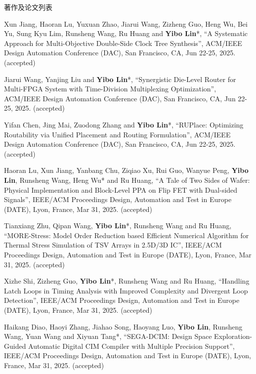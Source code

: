 \begin{rSection}{著作及论文列表}
\begin{description}[font=\normalfont, rightmargin=2em]
\item[{[C176]}]{
        Xun Jiang, Haoran Lu, Yuxuan Zhao, Jiarui Wang, Zizheng Guo, Heng Wu, Bei Yu, Sung Kyu Lim, Runsheng Wang, Ru Huang and \textbf{Yibo Lin}*, 
    ``A Systematic Approach for Multi-Objective Double-Side Clock Tree Synthesis'', 
    ACM/IEEE Design Automation Conference (DAC), San Francisco, CA, Jun 22-25, 2025.
    (accepted)
}
            

\item[{[C175]}]{
        Jiarui Wang, Yanjing Liu and \textbf{Yibo Lin}*, 
    ``Synergistic Die-Level Router for Multi-FPGA System with Time-Division Multiplexing Optimization'', 
    ACM/IEEE Design Automation Conference (DAC), San Francisco, CA, Jun 22-25, 2025.
    (accepted)
}
            

\item[{[C174]}]{
        Yifan Chen, Jing Mai, Zuodong Zhang and \textbf{Yibo Lin}*, 
    ``RUPlace: Optimizing Routability via Unified Placement and Routing Formulation'', 
    ACM/IEEE Design Automation Conference (DAC), San Francisco, CA, Jun 22-25, 2025.
    (accepted)
}
            

\item[{[C173]}]{
        Haoran Lu, Xun Jiang, Yanbang Chu, Ziqiao Xu, Rui Guo, Wanyue Peng, \textbf{Yibo Lin}, Runsheng Wang, Heng Wu* and Ru Huang, 
    ``A Tale of Two Sides of Wafer: Physical Implementation and Block-Level PPA on Flip FET with Dual-sided Signals'', 
    IEEE/ACM Proceedings Design, Automation and Test in Europe (DATE), Lyon, France, Mar 31, 2025.
    (accepted)
}
            

\item[{[C172]}]{
        Tianxiang Zhu, Qipan Wang, \textbf{Yibo Lin}*, Runsheng Wang and Ru Huang, 
    ``MORE-Stress: Model Order Reduction based Efficient Numerical Algorithm for Thermal Stress Simulation of TSV Arrays in 2.5D/3D IC'', 
    IEEE/ACM Proceedings Design, Automation and Test in Europe (DATE), Lyon, France, Mar 31, 2025.
    (accepted)
}
            

\item[{[C171]}]{
        Xizhe Shi, Zizheng Guo, \textbf{Yibo Lin}*, Runsheng Wang and Ru Huang, 
    ``Handling Latch Loops in Timing Analysis with Improved Complexity and Divergent Loop Detection'', 
    IEEE/ACM Proceedings Design, Automation and Test in Europe (DATE), Lyon, France, Mar 31, 2025.
    (accepted)
}
            

\item[{[C170]}]{
        Haikang Diao, Haoyi Zhang, Jiahao Song, Haoyang Luo, \textbf{Yibo Lin}, Runsheng Wang, Yuan Wang and Xiyuan Tang*, 
    ``SEGA-DCIM: Design Space Exploration-Guided Automatic Digital CIM Compiler with Multiple Precision Support'', 
    IEEE/ACM Proceedings Design, Automation and Test in Europe (DATE), Lyon, France, Mar 31, 2025.
    (accepted)
}
            


\end{description}
\end{rSection}
